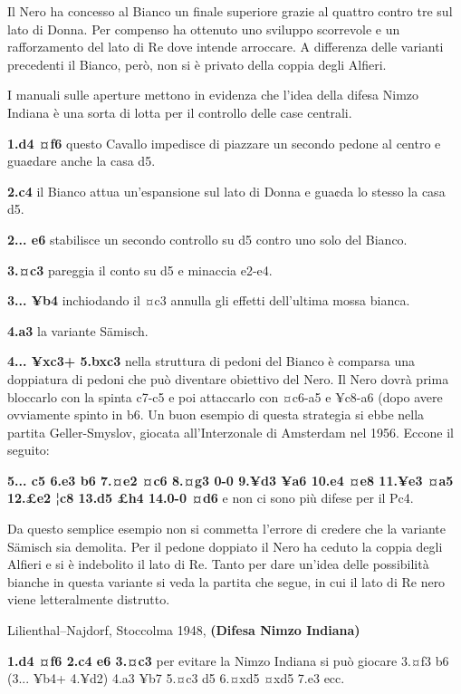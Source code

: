 
Il Nero ha concesso al Bianco un finale superiore grazie al quattro
contro tre sul lato di Donna. Per compenso ha ottenuto uno sviluppo
scorrevole e un rafforzamento del lato di Re dove intende arroccare. A
differenza delle varianti precedenti il Bianco, però, non si è privato
della coppia degli Alfieri.

I manuali sulle aperture mettono in evidenza che l'idea della difesa
Nimzo Indiana è una sorta di lotta per il controllo delle case centrali.

\textbf{1.d4 ¤f6} questo Cavallo impedisce di piazzare un secondo pedone
al centro e gua¢dare anche la casa d5.

\textbf{2.c4} il Bianco attua un'espansione sul lato di Donna e gua¢da
lo stesso la casa d5.

\textbf{2... e6} stabilisce un secondo controllo su d5 contro uno solo
del Bianco.

\textbf{3.¤c3} pareggia il conto su d5 e minaccia e2-e4.

\textbf{3... ¥b4} inchiodando il ¤c3 annulla gli effetti dell'ultima
mossa bianca.

\textbf{4.a3} la variante Sämisch.

\textbf{4... ¥xc3+ 5.bxc3} nella struttura di pedoni del Bianco è
comparsa una doppiatura di pedoni che può diventare obiettivo del Nero.
Il Nero dovrà prima bloccarlo con la spinta c7-c5 e poi attaccarlo con
¤c6-a5 e ¥c8-a6 (dopo avere ovviamente spinto in b6. Un buon esempio di
questa strategia si ebbe nella partita Geller-Smyslov, giocata
all'Interzonale di Amsterdam nel 1956. Eccone il seguito:

\textbf{5... c5 6.e3 b6 7.¤e2 ¤c6 8.¤g3 0-0 9.¥d3 ¥a6 10.e4 ¤e8 11.¥e3
¤a5 12.£e2 ¦c8 13.d5 £h4 14.0-0 ¤d6} e non ci sono più difese per il
Pc4.

Da questo semplice esempio non si commetta l'errore di credere che la
variante Sämisch sia demolita. Per il pedone doppiato il Nero ha ceduto
la coppia degli Alfieri e si è indebolito il lato di Re. Tanto per dare
un'idea delle possibilità bianche in questa variante si veda la partita
che segue, in cui il lato di Re nero viene letteralmente distrutto.

Lilienthal--Najdorf, Stoccolma 1948, \textbf{(Difesa Nimzo Indiana)}

\textbf{1.d4 ¤f6 2.c4 e6 3.¤c3} per evitare la Nimzo Indiana si può
giocare 3.¤f3 b6 (3... ¥b4+ 4.¥d2) 4.a3 ¥b7 5.¤c3 d5 6.¤xd5 ¤xd5 7.e3
ecc.


